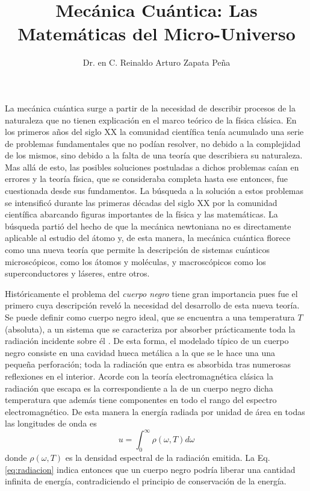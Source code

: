 \documentclass{article}
\title{Mecánica Cuántica: Las Matemáticas del Micro-Universo}
\author{Dr. en C. Reinaldo Arturo Zapata Peña}
\date{}
\begin{document}
\maketitle

La mecánica cuántica surge a partir de la necesidad de describir procesos de la
naturaleza que no tienen explicación en el marco teórico de la física clásica.
% 
En los primeros años del siglo XX la comunidad científica tenía acumulado una
serie de problemas fundamentales que no podían resolver, no debido a la
complejidad de los mismos, sino debido a la falta de una teoría que describiera
su naturaleza. 
% 
Mas allá de esto, las posibles soluciones postuladas a dichos problemas caían
en errores y la teoría física, que se consideraba completa hasta ese entonces,
fue cuestionada desde sus fundamentos.
% 
La búsqueda a la solución a estos problemas se intensificó durante las primeras
décadas del siglo XX por la comunidad científica abarcando figuras importantes
de la física y las matemáticas. La búsqueda partió del hecho de que la
mecánica newtoniana no es directamente aplicable al estudio del átomo y,
% 
de esta manera, la mecánica cuántica florece como una nueva teoría que permite
la descripción de sistemas cuánticos microscópicos, como los átomos y
moléculas, y macroscópicos como los superconductores y láseres, entre otros.

Históricamente el problema del \emph{cuerpo negro} tiene gran importancia pues
fue el primero cuya descripción reveló la necesidad del desarrollo de esta
nueva teoría. 
% 
Se puede definir como cuerpo negro ideal, que se encuentra a una temperatura
$T$ (absoluta), a un sistema que se caracteriza por absorber prácticamente toda
la radiación incidente sobre él \cite{planck2013theory}.
% 
De esta forma, el modelado típico de un cuerpo negro consiste en una cavidad
hueca metálica a la que se le hace una una pequeña perforación; toda la
radiación que entra es absorbida tras numerosas reflexiones en el interior.
% 
Acorde con la teoría electromagnética clásica la radiación que escapa es la
correspondiente a la de un cuerpo negro dicha temperatura que además tiene
componentes en todo el rango del espectro electromagnético. De esta manera la
energía radiada por unidad de área en todas las longitudes de onda es
\begin{equation}\label{eq:radiacion}
u = \int _{0}^{\infty} \rho (\omega, T) d\omega
\end{equation}
donde $\rho (\omega, T)$ es la densidad espectral de la radiación emitida. La
Eq. \eqref{eq:radiacion} indica entonces que un cuerpo negro podría liberar una
cantidad infinita de energía, contradiciendo el principio de conservación de la
energía.
\end{document}
